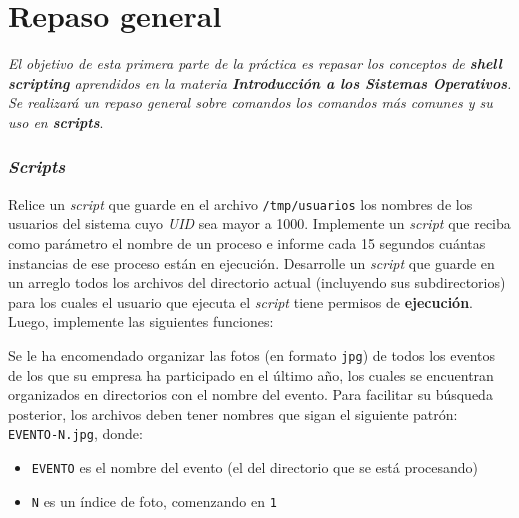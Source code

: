 \section{Repaso general}

\textit{El objetivo de esta primera parte de la práctica es repasar los
  conceptos de \textbf{shell scripting} aprendidos en la materia
  \textbf{Introducción a los Sistemas Operativos}. Se realizará un repaso
  general sobre comandos los comandos más comunes y su uso en
  \textbf{scripts}}.

\subsubsection{\textit{Scripts}}

\begin{questions}
\question Relice un \textit{script} que guarde en el archivo \texttt{/tmp/usuarios} los
nombres de los usuarios del sistema cuyo \textit{UID} sea mayor a 1000.
\question Implemente un \textit{script} que reciba como parámetro el nombre de un
proceso e informe cada 15 segundos cuántas instancias de ese proceso están en
ejecución.
\question Desarrolle un \textit{script} que guarde en un arreglo todos los archivos del
directorio actual (incluyendo sus subdirectorios) para los cuales el usuario que ejecuta
el \textit{script} tiene permisos de \textbf{ejecución}. Luego, implemente las siguientes
funciones:
\question Se le ha encomendado organizar las fotos (en formato \texttt{jpg}) de todos los eventos
de los que su empresa ha participado en el último año, los cuales se encuentran organizados en
directorios con el nombre del evento. Para facilitar su búsqueda posterior, los archivos deben
tener nombres que sigan el siguiente patrón: \texttt{EVENTO-N.jpg}, donde:
\begin{itemize}
  \item \texttt{EVENTO} es el nombre del evento (el del directorio que se está procesando)
  \item \texttt{N} es un índice de foto, comenzando en \texttt{1}
\end{itemize}


\end{questions}
